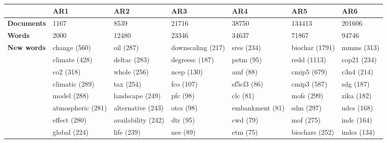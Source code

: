 \begin{tabular}{l p{2.8cm} p{2.8cm} p{2.8cm} p{2.8cm} p{2.8cm} p{2.8cm}} 
&\textbf{AR1} & \textbf{AR2} & \textbf{AR3} & \textbf{AR4} & \textbf{AR5} & \textbf{AR6}\\ \hline\textbf{Documents} &1167 & 8539 & 21716 & 38750 & 134413 & 201606\\ 
\textbf{Words} &2000 & 12480 & 23346 & 34637 & 71867 & 94746\\ 
\textbf{New words} & change (560) & oil (287) & downscaling (217) & sres (234) & biochar (1791) & mmms (313)\\ & climate (428) & deltac (283) & degreesc (187) & petm (95) & redd (1113) & cop21 (234)\\ & co2 (318) & whole (256) & ncep (130) & amf (88) & cmip5 (679) & c3n4 (214)\\ & climatic (289) & tax (254) & fco (107) & sf5cf3 (86) & cmip3 (587) & sdg (187)\\ & model (288) & landscape (249) & pfc (98) & clc (81) & mofs (299) & zika (182)\\ & atmospheric (281) & alternative (243) & otcs (98) & embankment (81) & sdm (297) & ndcs (168)\\ & effect (280) & availability (242) & dtr (95) & cwd (79) & mof (275) & indc (164)\\ & global (224) & life (239) & nee (89) & etm (75) & biochars (252) & indcs (134)
\end{tabular}